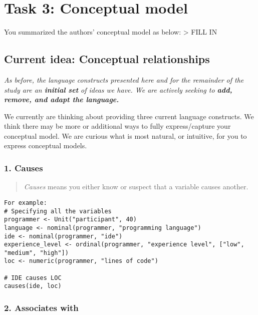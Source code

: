 \hypertarget{conceptual-model}{%
\section{Task 3: Conceptual model}\label{conceptual-model}}

You summarized the authors' conceptual model as below: \textgreater{}
FILL IN

\hypertarget{current-idea-conceptual-relationships}{%
\subsection*{Current idea: Conceptual
relationships}\label{current-idea-conceptual-relationships}}

\emph{As before, the language constructs presented here and for the
remainder of the study are an \textbf{initial set} of ideas we have. We
are actively seeking to \textbf{add, remove, and adapt the language.}}

We currently are thinking about providing three current language
constructs. We think there may be more or additional ways to fully
express/capture your conceptual model. We are curious what is most
natural, or intuitive, for you to express conceptual models.

\hypertarget{causes}{%
\subsubsection{1. Causes}\label{causes}}

\begin{quote}
\emph{Causes} means you either know or suspect that a variable causes
another.
\end{quote}

\begin{verbatim}
For example:
# Specifying all the variables
programmer <- Unit("participant", 40)
language <- nominal(programmer, "programming language")
ide <- nominal(programmer, "ide")
experience_level <- ordinal(programmer, "experience level", ["low", "medium", "high"])
loc <- numeric(programmer, "lines of code")

# IDE causes LOC
causes(ide, loc)
\end{verbatim}

\hypertarget{associates-with}{%
\subsubsection{2. Associates with}\label{associates-with}}

